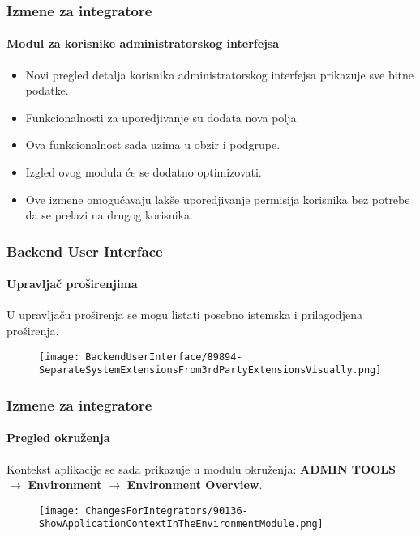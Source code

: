 
\begin{frame}[fragile]
	\frametitle{Izmene za integratore}
	\framesubtitle{Modul za korisnike administratorskog interfejsa}

	\begin{itemize}
		\item Novi pregled detalja korisnika administratorskog interfejsa prikazuje sve bitne podatke.
		\item Funkcionalnosti za uporedjivanje su dodata nova polja.
		\item Ova funkcionalnost sada uzima u obzir i podgrupe.
		\item Izgled ovog modula će se dodatno optimizovati.
		\item Ove izmene omogućavaju lakše uporedjivanje permisija korisnika bez potrebe
			da se prelazi na drugog korisnika.
	\end{itemize}

\end{frame}


\begin{frame}[fragile]
	\frametitle{Backend User Interface}
	\framesubtitle{Upravljač proširenjima}

	U upravljaču proširenja se mogu listati posebno istemska i prilagodjena proširenja.

	\begin{figure}
		\texttt{[image: BackendUserInterface/89894-SeparateSystemExtensionsFrom3rdPartyExtensionsVisually.png]}
	\end{figure}

\end{frame}


\begin{frame}[fragile]
	\frametitle{Izmene za integratore}
	\framesubtitle{Pregled okruženja}

	Kontekst aplikacije se sada prikazuje u modulu okruženja:\newline
	\textbf{ADMIN TOOLS} $\rightarrow$ \textbf{Environment} $\rightarrow$ \textbf{Environment Overview}.

	\begin{figure}
		\texttt{[image: ChangesForIntegrators/90136-ShowApplicationContextInTheEnvironmentModule.png]}
	\end{figure}

\end{frame}

